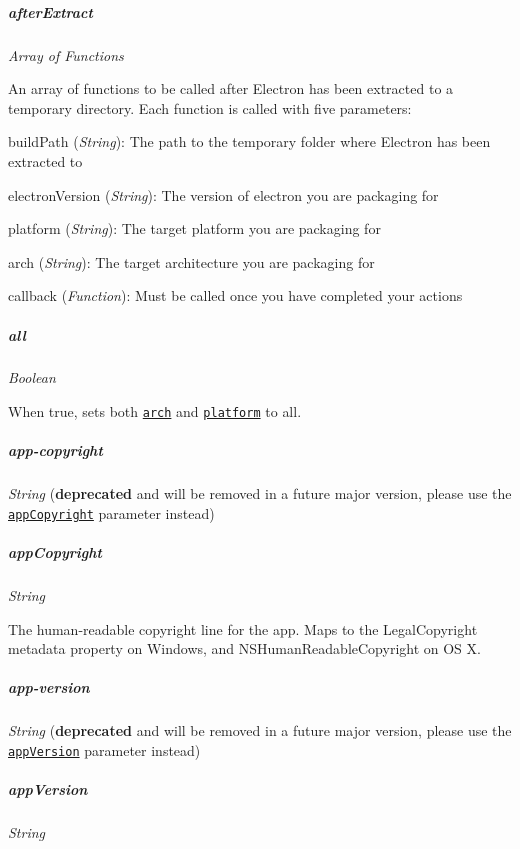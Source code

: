 \subparagraph*{{\ttfamily after\+Extract}}

{\itshape Array of Functions}

An array of functions to be called after Electron has been extracted to a temporary directory. Each function is called with five parameters\+:


\begin{DoxyItemize}
\item {\ttfamily build\+Path} ({\itshape String})\+: The path to the temporary folder where Electron has been extracted to
\item {\ttfamily electron\+Version} ({\itshape String})\+: The version of electron you are packaging for
\item {\ttfamily platform} ({\itshape String})\+: The target platform you are packaging for
\item {\ttfamily arch} ({\itshape String})\+: The target architecture you are packaging for
\item {\ttfamily callback} ({\itshape Function})\+: Must be called once you have completed your actions
\end{DoxyItemize}

\subparagraph*{{\ttfamily all}}

{\itshape Boolean}

When {\ttfamily true}, sets both \href{#arch}{\tt {\ttfamily arch}} and \href{#platform}{\tt {\ttfamily platform}} to {\ttfamily all}.

\subparagraph*{{\ttfamily app-\/copyright}}

{\itshape String} ({\bfseries deprecated} and will be removed in a future major version, please use the \href{#appcopyright}{\tt {\ttfamily app\+Copyright}} parameter instead)

\subparagraph*{{\ttfamily app\+Copyright}}

{\itshape String}

The human-\/readable copyright line for the app. Maps to the {\ttfamily Legal\+Copyright} metadata property on Windows, and {\ttfamily N\+S\+Human\+Readable\+Copyright} on OS X.

\subparagraph*{{\ttfamily app-\/version}}

{\itshape String} ({\bfseries deprecated} and will be removed in a future major version, please use the \href{#appversion}{\tt {\ttfamily app\+Version}} parameter instead)

\subparagraph*{{\ttfamily app\+Version}}

{\itshape String}

